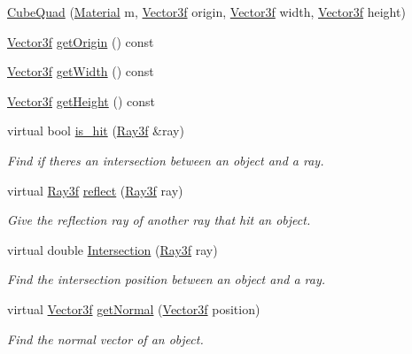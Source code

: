 \begin{DoxyCompactItemize}
\item 
\mbox{\hyperlink{class_cube_quad_a3fa4c62ac49699d72d1a8c8fdca2f2cb}{Cube\+Quad}} (\mbox{\hyperlink{class_material}{Material}} m, \mbox{\hyperlink{class_vector3f}{Vector3f}} origin, \mbox{\hyperlink{class_vector3f}{Vector3f}} width, \mbox{\hyperlink{class_vector3f}{Vector3f}} height)
\item 
\mbox{\hyperlink{class_vector3f}{Vector3f}} \mbox{\hyperlink{class_cube_quad_abe8372c7f59cd9ff9a5a668fcd437a76}{get\+Origin}} () const
\item 
\mbox{\hyperlink{class_vector3f}{Vector3f}} \mbox{\hyperlink{class_cube_quad_a7229846a07dc9f641d16a488da740a49}{get\+Width}} () const
\item 
\mbox{\hyperlink{class_vector3f}{Vector3f}} \mbox{\hyperlink{class_cube_quad_adfb45d0ba7d9fce02b6ee82a7872262f}{get\+Height}} () const
\item 
virtual bool \mbox{\hyperlink{class_cube_quad_a8d55228ceeed7ce319bc6d8fe8f6b67f}{is\+\_\+hit}} (\mbox{\hyperlink{class_ray3f}{Ray3f}} \&ray)
\begin{DoxyCompactList}\small\item\em Find if there\textquotesingle{}s an intersection between an object and a ray. \end{DoxyCompactList}\item 
virtual \mbox{\hyperlink{class_ray3f}{Ray3f}} \mbox{\hyperlink{class_cube_quad_a18ef5943f0cfd8b9b72950211691314a}{reflect}} (\mbox{\hyperlink{class_ray3f}{Ray3f}} ray)
\begin{DoxyCompactList}\small\item\em Give the reflection ray of another ray that hit an object. \end{DoxyCompactList}\item 
virtual double \mbox{\hyperlink{class_cube_quad_a3b51f8216f2ba340174edb542af33c0a}{Intersection}} (\mbox{\hyperlink{class_ray3f}{Ray3f}} ray)
\begin{DoxyCompactList}\small\item\em Find the intersection position between an object and a ray. \end{DoxyCompactList}\item 
virtual \mbox{\hyperlink{class_vector3f}{Vector3f}} \mbox{\hyperlink{class_cube_quad_aba1f984ce9580e2e430ace0137a0f249}{get\+Normal}} (\mbox{\hyperlink{class_vector3f}{Vector3f}} position)
\begin{DoxyCompactList}\small\item\em Find the normal vector of an object. \end{DoxyCompactList}\end{DoxyCompactItemize}
